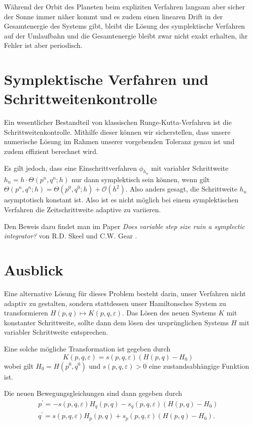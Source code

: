 \documentclass{handout}
\begin{document}
Während der Orbit des Planeten beim expliziten Verfahren langsam aber sicher der Sonne immer näher kommt und es zudem einen linearen Drift in der Gesamtenergie des Systems gibt, bleibt die Lösung des symplektische Verfahren auf der Umlaufbahn und die Gesamtenergie bleibt zwar nicht exakt erhalten, ihr Fehler ist aber periodisch. 

\section{Symplektische Verfahren und Schrittweitenkontrolle}
Ein wesentlicher Bestandteil von klassischen Runge-Kutta-Verfahren ist die Schrittweitenkontrolle. Mithilfe dieser können wir sicherstellen, dass unsere numerische Lösung im Rahmen unserer vorgebenden Toleranz genau ist und zudem effizient berechnet wird.

Es gilt jedoch, dass eine Einschrittverfahren $\phi_{h_n}$ mit variabler Schrittweite $h_n = h\cdot \Theta(p^n,q^n;h)$ nur dann symplektisch sein können, wenn gilt $\Theta(p^n,q^n;h) = \Theta(p^0,q^0;h) + \mathcal{O}(h^2)$. Also anders gesagt, die Schrittweite $h_n$ asymptotisch konstant ist. Also ist es nicht möglich bei einem symplektischen Verfahren die Zeitschrittweite adaptive zu variieren.  

Den Beweis dazu findet man im Paper \textit{Does variable step size ruin a symplectic integrator?} von R.D. Skeel und C.W. Gear \cite{SKEEL1992311}.

\section{Ausblick}
Eine alternative Lösung für dieses Problem besteht darin, unser Verfahren nicht adaptiv zu gestalten, sondern stattdessen unser Hamiltonsches System zu transformieren $H(p, q) \mapsto K(p, q, \varepsilon)$. Das Lösen des neuen Systems $K$ mit konstanter Schrittweite, sollte dann dem lösen des ursprünglichen Systems $H$ mit variabler Schrittweite entsprechen. 

Eine solche mögliche Transformation ist gegeben durch
\begin{equation}
    K(p, q, \varepsilon)=s(p, q, \varepsilon)\left(H(p, q)-H_0\right)
\end{equation}
wobei gilt $H_0 = H(p^0, q^0)$ und $s(p, q, \varepsilon) > 0 $ eine zustandsabhängige Funktion ist.

Die neuen Bewegungsgleichungen sind dann gegeben durch
\begin{equation}
\begin{split}
     p^{\prime}=-s(p, q, \varepsilon) H_q(p, q)-s_q(p, q, \varepsilon)\left(H(p, q)-H_0\right) \\
     q^{\prime}=s(p, q, \varepsilon) H_p(p, q)+s_p(p, q, \varepsilon)\left(H(p, q)-H_0\right).
\end{split}
\end{equation}
\end{document}
